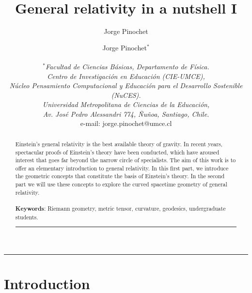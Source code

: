 \documentclass[11pt,letterpaper]{article}
\author{Jorge Pinochet}
\title{\textbf{General relativity in a nutshell I}}
\begin{document}
\author{Jorge Pinochet$^{*}$\\ \\
 \small{$^{*}$\textit{Facultad de Ciencias Básicas, Departamento de Física. }}\\
  \small{\textit{Centro de Investigación en Educación (CIE-UMCE),}}\\
 \small{\textit{Núcleo Pensamiento Computacional y Educación para el Desarrollo Sostenible (NuCES).}}\\
 \small{\textit{Universidad Metropolitana de Ciencias de la Educación,}}\\
 \small{\textit{Av. José Pedro Alessandri 774, Ñuñoa, Santiago, Chile.}}\\
 \small{e-mail: jorge.pinochet@umce.cl}\\}


\date{}
\maketitle

\begin{center}\rule{0.9\textwidth}{0.1mm} \end{center}
\begin{abstract}
\noindent Einstein's general relativity is the best available theory of gravity. In recent years, spectacular proofs of Einstein's theory have been conducted, which have aroused interest that goes far beyond the narrow circle of specialists. The aim of this work is to offer an elementary introduction to general relativity. In this first part, we introduce the geometric concepts that constitute the basis of Einstein's theory. In the second part we will use these concepts to explore the curved spacetime geometry of general relativity.\\ \\

\noindent \textbf{Keywords}: Riemann geometry, metric tensor, curvature, geodesics, undergraduate students. 

\begin{center}\rule{0.9\textwidth}{0.1mm} \end{center}
\end{abstract}


\maketitle

\section{Introduction}
\end{document}
